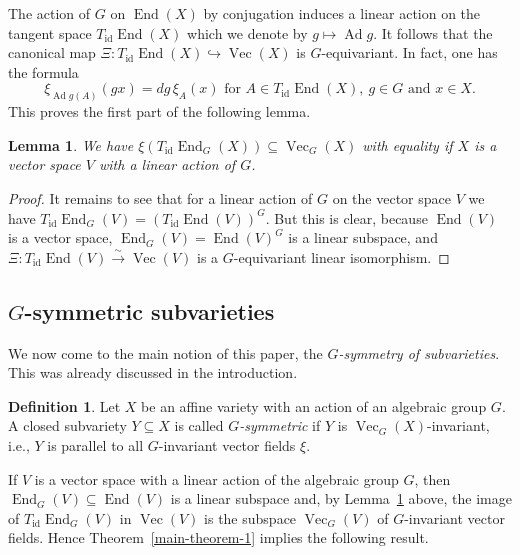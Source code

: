 \documentclass{amsart}
\newtheorem{lem}[thm]{Lemma}
\theoremstyle{definition}
\newtheorem{defn}[thm]{Definition}
\theoremstyle{remark}
\begin{document}
The action of $G$ on $\operatorname{End}(X)$ by conjugation induces a linear action on the tangent space $T_\operatorname{id}\operatorname{End}(X)$ which we denote by $g\mapsto \operatorname{Ad} g$. It follows that the canonical map $\Xi\colon T_\operatorname{id}\operatorname{End}(X) {\hookrightarrow} \operatorname{Vec}(X)$ is $G$-equivariant. In fact, one has the formula
$$
\xi_{\operatorname{Ad} g (A)}(gx) = dg \, \xi_{A}(x) \text{ for } A \in T_\operatorname{id}\operatorname{End}(X), \ g \in  G \text{ and }  x \in X.
$$
This proves the first part of the following lemma.

\begin{lem}\label{G-invariantVF.lem}
We have $\xi(T_\operatorname{id}\operatorname{End}_{G}(X)) \subseteq \operatorname{Vec}_{G}(X)$ with equality if $X$ is a vector space $V$ with a linear action of $G$.
\end{lem}
\begin{proof}
It remains to see that for a linear action of $G$ on the vector space $V$ we have $T_\operatorname{id}\operatorname{End}_{G}(V) = (T_\operatorname{id}\operatorname{End}(V))^{G}$. But this is clear, because  $\operatorname{End}(V)$ is a vector space, $\operatorname{End}_{G}(V) = \operatorname{End}(V)^{G}$  is a linear subspace, and $\Xi\colon T_\operatorname{id}\operatorname{End}(V) {\xrightarrow{\sim}} \operatorname{Vec}(V)$ is a $G$-equivariant linear isomorphism.
\end{proof}

{\par\smallskip}
\subsection{$G$-symmetric subvarieties}
We now come to the main notion of this paper, the {\it $G$-symmetry of subvarieties}. This was already discussed in the introduction.
\begin{defn}
Let $X$ be an affine variety with an action of an algebraic group $G$. A closed subvariety $Y \subseteq X$ is called {\it $G$-symmetric\/} if $Y$ is 
$\operatorname{Vec}_{G}(X)$-invariant, i.e., $Y$ is parallel to all $G$-invariant vector fields $\xi$.
\end{defn}

If $V$ is a vector space with a linear action of the algebraic group $G$, then $\operatorname{End}_{G}(V) {\subseteq} \operatorname{End}(V)$ is a linear subspace and, by Lemma~\ref{G-invariantVF.lem} above,  the image of $T_\operatorname{id}\operatorname{End}_{G}(V)$ in $\operatorname{Vec}(V)$ is the subspace $\operatorname{Vec}_{G}(V)$ of $G$-invariant vector fields. Hence Theorem~\ref{main-theorem-1} implies the following result.
\end{document}
